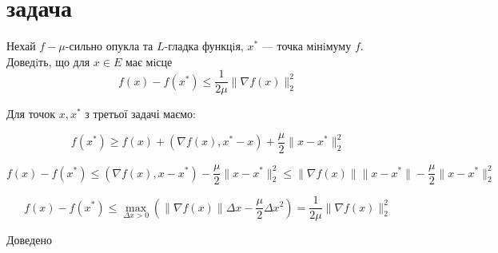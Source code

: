\section{задача}

\begin{tcolorbox}[title=Умова]
    Нехай $f - \mu$-сильно опукла та $L$-гладка функцiя, $x^*$ — точка мiнiмуму $f$. Доведiть, що для $x \in E$ має мiсце
    $$ f(x) - f(x^*) \le \frac{1}{2\mu}\|\nabla f(x)\|_2^2 $$
\end{tcolorbox}

Для точок $x, x^*$ з третьої задачі маємо:

$$ f(x^*) \geq f(x) + (\nabla f(x), x^* - x) + \frac{\mu}{2} \|x - x^*\|_2^2 $$


$$ f(x) - f(x^*) \le (\nabla f(x), x - x^*) - \frac{\mu}{2} \|x - x^*\|_2^2 \le 
\|\nabla f(x)\| \|x - x^*\| - \frac{\mu}{2} \|x - x^*\|_2^2$$

$$ f(x) - f(x^*) \le \max\limits_{\Delta x > 0} (\|\nabla f(x)\| \Delta x - \frac{\mu}{2} \Delta x^2) = \frac{1}{2\mu}\|\nabla f(x)\|_2^2 $$

Доведено